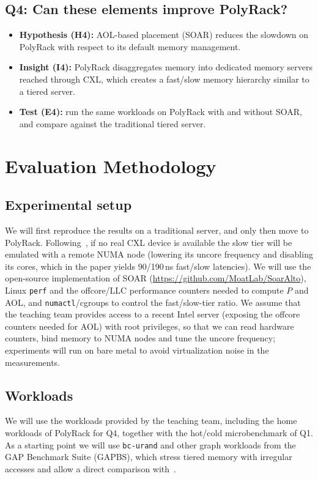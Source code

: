 \documentclass[conference]{IEEEtran}
\begin{document}
\subsection{Q4: Can these elements improve PolyRack?}
\begin{itemize}
  \item \textbf{Hypothesis (H4):} AOL-based placement (SOAR) reduces the
        slowdown on PolyRack with respect to its default memory management.
  \item \textbf{Insight (I4):} PolyRack disaggregates memory into dedicated
        memory servers reached through CXL, which creates a
        fast/slow memory hierarchy similar to a tiered server.
  \item \textbf{Test (E4):} run the same workloads on PolyRack with and
        without SOAR, and compare against the traditional tiered server.
       

\end{itemize}


\section{Evaluation Methodology}
\label{sec:evaluation}

\subsection{Experimental setup}
We will first reproduce the results on a traditional server, and only then
move to PolyRack. Following~\cite{liu2025tiered}, if no real CXL device is
available the slow tier will be emulated with a remote NUMA node (lowering its
uncore frequency and disabling its cores, which in the paper yields 90/190\,ns
fast/slow latencies). We will use the open-source implementation of SOAR
(\url{https://github.com/MoatLab/SoarAlto}), Linux \texttt{perf} and the
offcore/LLC performance counters needed to compute $P$ and AOL, and
\texttt{numactl}/cgroups to control the fast/slow-tier ratio.
We assume that the teaching team provides access to a recent Intel server
(exposing the offcore counters needed for AOL) with root privileges, so that
we can read hardware counters, bind memory to NUMA nodes and tune the uncore
frequency; experiments will run on bare metal to avoid virtualization noise in
the measurements.

\subsection{Workloads}
We will use the workloads provided by the teaching team, including the home
workloads of PolyRack for Q4, together with the hot/cold microbenchmark of Q1.
As a starting point we will use \texttt{bc-urand} and other graph workloads
from the GAP Benchmark Suite (GAPBS), which stress tiered memory with
irregular accesses and allow a direct comparison with~\cite{liu2025tiered}.
\end{document}
